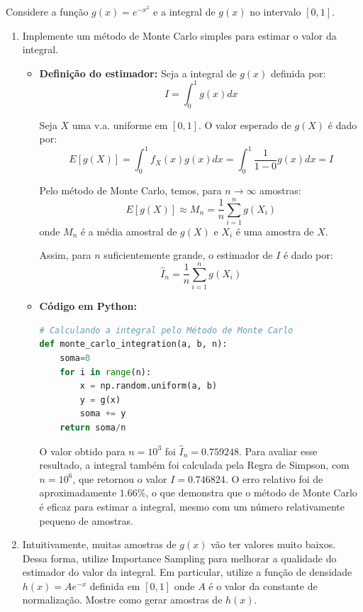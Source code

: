 \documentclass[12 pt]{article}
\begin{document}
Considere a função $g(x) = e^{-x^2}$ e a integral de $g(x)$ no intervalo $[0, 1]$.

\begin{enumerate}
    \item Implemente um método de Monte Carlo simples para estimar o valor da integral.
    \begin{tcolorbox}[colframe=black, title=Resposta:]
        \begin{itemize}
            \item \textbf{Definição do estimador:}
        Seja a integral de $g(x)$ definida por:
         $$I = \int_0^1 g(x) dx$$

        Seja $X$ uma v.a. uniforme em $[0, 1]$. O valor esperado de $g(X)$ é dado por:
        $$
        E[g(X)] = \int_0^1 f_X(x)g(x) dx = \int_0^1 \frac{1}{1-0}g(x) dx = I
        $$
        
        Pelo método de Monte Carlo, temos, para $n \rightarrow \infty$ amostras:
        $$
        E[g(X)] \approx M_n = \frac{1}{n} \sum_{i=1}^n g(X_i)
        $$
        onde $M_n$ é a média amostral de $g(X)$ e $X_i$ é uma amostra de $X$. 
        
        Assim, para $n$ suficientemente grande, o estimador de $I$ é dado por:
        $$
        \hat{I}_n = \frac{1}{n} \sum_{i=1}^n g(X_i)
        $$

        \item \textbf{Código em Python:}
        \begin{lstlisting}[language=Python]
# Calculando a integral pelo Método de Monte Carlo
def monte_carlo_integration(a, b, n):
    soma=0
    for i in range(n):
        x = np.random.uniform(a, b)
        y = g(x)
        soma += y
    return soma/n
        \end{lstlisting}

    O valor obtido para $n=10^3$ foi \underline{$\hat{I}_n = 0.759248$}. Para avaliar esse resultado, a integral também foi calculada pela Regra de Simpson, com  $n=10^6$, que retornou o valor $I =  0.746824$. O erro relativo foi de aproximadamente $1.66\%$, o que demonstra que o método de Monte Carlo é eficaz para estimar a integral, mesmo com um número relativamente pequeno de amostras.

    \end{itemize}
    \end{tcolorbox}
    \newpage
    \item Intuitivamente, muitas amostras de $g(x)$ vão ter valores muito baixos. Dessa forma, utilize Importance Sampling para melhorar a qualidade do estimador do valor da integral. Em particular, utilize a função de densidade $h(x) = Ae^{-x}$ definida em $[0, 1]$ onde $A$ é o valor da constante de normalização. Mostre como gerar amostras de $h(x)$.
    \begin{tcolorbox}[colframe=black, title=Resposta:]
        \begin{itemize}


\end{itemize}
\end{tcolorbox}
\end{enumerate}
\end{document}
